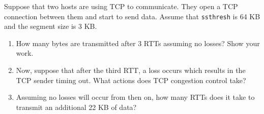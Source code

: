 \documentclass{report}
\begin{document}
\clearpage
\begin{problem}

Suppose that two hosts are using TCP to communicate. They open a TCP connection between them and start to send data. Assume that \texttt{ssthresh} is 64 KB and the segment size is 3 KB.
\begin{enumerate}
	\item How many bytes are transmitted after 3 RTTs assuming no losses? Show your work.
	\item Now, suppose that after the third RTT, a loss occurs which results in the TCP sender timing out. What actions does TCP congestion control take?
	\item Assuming no losses will occur from then on, how many RTTs does it take to transmit an additional 22 KB of data?
\end{enumerate}

\begin{answer}{35em}
\end{answer}

\end{problem}
\end{document}
